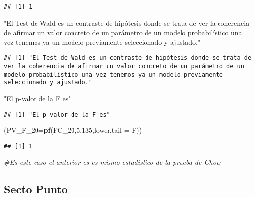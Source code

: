 \documentclass[
]{article}
\newenvironment{Shaded}{\begin{snugshade}}{\end{snugshade}}
\newcommand{\CommentTok}[1]{\textcolor[rgb]{0.56,0.35,0.01}{\textit{#1}}}
\newcommand{\DataTypeTok}[1]{\textcolor[rgb]{0.13,0.29,0.53}{#1}}
\newcommand{\DecValTok}[1]{\textcolor[rgb]{0.00,0.00,0.81}{#1}}
\newcommand{\KeywordTok}[1]{\textcolor[rgb]{0.13,0.29,0.53}{\textbf{#1}}}
\newcommand{\NormalTok}[1]{#1}
\newcommand{\StringTok}[1]{\textcolor[rgb]{0.31,0.60,0.02}{#1}}
\begin{document}
\begin{verbatim}
## [1] 1
\end{verbatim}

\begin{Shaded}
\begin{Highlighting}[]
\StringTok{"El Test de Wald es un contraste de hipótesis donde se trata de ver la coherencia de afirmar un valor concreto de un parámetro de un modelo probabilístico una vez tenemos ya un modelo previamente seleccionado y ajustado."}
\end{Highlighting}
\end{Shaded}

\begin{verbatim}
## [1] "El Test de Wald es un contraste de hipótesis donde se trata de ver la coherencia de afirmar un valor concreto de un parámetro de un modelo probabilístico una vez tenemos ya un modelo previamente seleccionado y ajustado."
\end{verbatim}

\begin{Shaded}
\begin{Highlighting}[]
\StringTok{"El p-valor de la F es"}
\end{Highlighting}
\end{Shaded}

\begin{verbatim}
## [1] "El p-valor de la F es"
\end{verbatim}

\begin{Shaded}
\begin{Highlighting}[]
\NormalTok{(}\DataTypeTok{PV_F_20=}\KeywordTok{pf}\NormalTok{(FC_}\DecValTok{20}\NormalTok{,}\DecValTok{5}\NormalTok{,}\DecValTok{135}\NormalTok{,}\DataTypeTok{lower.tail =}\NormalTok{ F))}
\end{Highlighting}
\end{Shaded}

\begin{verbatim}
## [1] 1
\end{verbatim}

\begin{Shaded}
\begin{Highlighting}[]
\CommentTok{#Es este caso el anterior es es mismo estadistico de la prueba de Chow}
\end{Highlighting}
\end{Shaded}

\hypertarget{secto-punto}{%
\subsection{Secto Punto}\label{secto-punto}}
\end{document}
